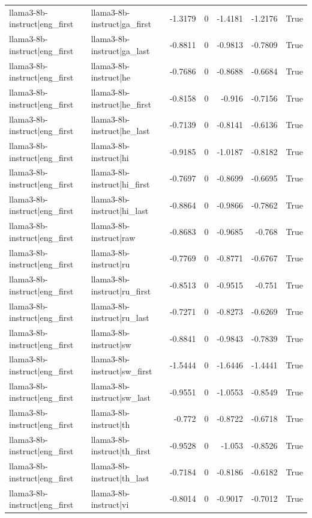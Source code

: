 \begin{table}
\begin{tabular}{l l r r r r l}
llama3-8b-instruct|eng_first & llama3-8b-instruct|ga_first & -1.3179 & 0 & -1.4181 & -1.2176 & True \\
llama3-8b-instruct|eng_first & llama3-8b-instruct|ga_last & -0.8811 & 0 & -0.9813 & -0.7809 & True \\
llama3-8b-instruct|eng_first & llama3-8b-instruct|he & -0.7686 & 0 & -0.8688 & -0.6684 & True \\
llama3-8b-instruct|eng_first & llama3-8b-instruct|he_first & -0.8158 & 0 & -0.916 & -0.7156 & True \\
llama3-8b-instruct|eng_first & llama3-8b-instruct|he_last & -0.7139 & 0 & -0.8141 & -0.6136 & True \\
llama3-8b-instruct|eng_first & llama3-8b-instruct|hi & -0.9185 & 0 & -1.0187 & -0.8182 & True \\
llama3-8b-instruct|eng_first & llama3-8b-instruct|hi_first & -0.7697 & 0 & -0.8699 & -0.6695 & True \\
llama3-8b-instruct|eng_first & llama3-8b-instruct|hi_last & -0.8864 & 0 & -0.9866 & -0.7862 & True \\
llama3-8b-instruct|eng_first & llama3-8b-instruct|raw & -0.8683 & 0 & -0.9685 & -0.768 & True \\
llama3-8b-instruct|eng_first & llama3-8b-instruct|ru & -0.7769 & 0 & -0.8771 & -0.6767 & True \\
llama3-8b-instruct|eng_first & llama3-8b-instruct|ru_first & -0.8513 & 0 & -0.9515 & -0.751 & True \\
llama3-8b-instruct|eng_first & llama3-8b-instruct|ru_last & -0.7271 & 0 & -0.8273 & -0.6269 & True \\
llama3-8b-instruct|eng_first & llama3-8b-instruct|sw & -0.8841 & 0 & -0.9843 & -0.7839 & True \\
llama3-8b-instruct|eng_first & llama3-8b-instruct|sw_first & -1.5444 & 0 & -1.6446 & -1.4441 & True \\
llama3-8b-instruct|eng_first & llama3-8b-instruct|sw_last & -0.9551 & 0 & -1.0553 & -0.8549 & True \\
llama3-8b-instruct|eng_first & llama3-8b-instruct|th & -0.772 & 0 & -0.8722 & -0.6718 & True \\
llama3-8b-instruct|eng_first & llama3-8b-instruct|th_first & -0.9528 & 0 & -1.053 & -0.8526 & True \\
llama3-8b-instruct|eng_first & llama3-8b-instruct|th_last & -0.7184 & 0 & -0.8186 & -0.6182 & True \\
llama3-8b-instruct|eng_first & llama3-8b-instruct|vi & -0.8014 & 0 & -0.9017 & -0.7012 & True \\

\end{tabular}
\end{table}
